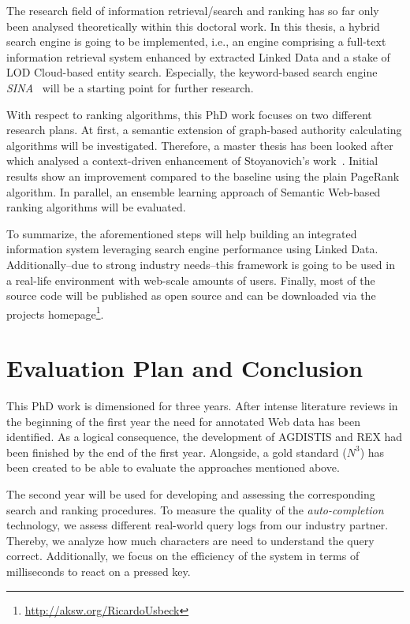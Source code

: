 The research field of information retrieval/search and ranking has so far only been analysed theoretically within this doctoral work. 
In this thesis, a hybrid search engine is going to be implemented, i.e., an engine comprising a full-text information retrieval system enhanced by extracted Linked Data and a stake of LOD Cloud-based entity search.
Especially, the keyword-based search engine \emph{SINA}~\cite{sina} will be a starting point for further research. 

With respect to ranking algorithms, this PhD work focuses on two different research plans.
At first, a semantic extension of graph-based authority calculating algorithms will be investigated. 
Therefore, a master thesis has been looked after which analysed a context-driven enhancement of Stoyanovich's work~\cite{Stoyanovich}.
Initial results show an improvement compared to the baseline using the plain PageRank algorithm.
In parallel, an ensemble learning approach of Semantic Web-based ranking algorithms will be evaluated.

To summarize, the aforementioned steps will help building an integrated information system leveraging search engine performance using Linked Data.
Additionally--due to strong industry needs--this framework is going to be used in a real-life environment with web-scale amounts of users.
Finally, most of the source code will be published as open source and can be downloaded via the projects homepage\footnote{\url{http://aksw.org/RicardoUsbeck}}.

\section{Evaluation Plan and Conclusion}\label{conclusion}
This PhD work is dimensioned for three years. 
After intense literature reviews in the beginning of the first year the need for annotated Web data has been identified.
As a logical consequence, the development of AGDISTIS and REX had been finished by the end of the first year. 
Alongside, a gold standard ($N^3$) has been created to be able to evaluate the approaches mentioned above.

The second year will be used for developing and assessing the corresponding search and ranking procedures. 
To measure the quality of the \emph{auto-completion} technology, we assess different real-world query logs from our industry partner.
Thereby, we analyze how much characters are need to understand the query correct.
Additionally, we focus on the efficiency of the system in terms of milliseconds to react on a pressed key.

